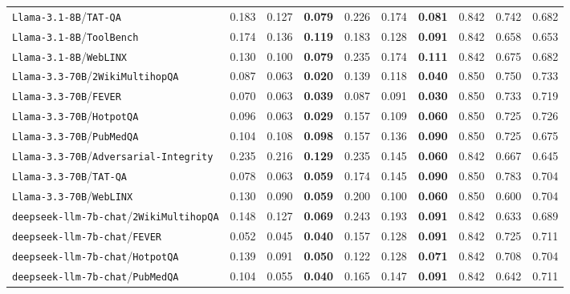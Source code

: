 \begin{longtable}{l|ccc|ccc|ccc}
\texttt{Llama-3.1-8B}/\texttt{TAT-QA} & 0.183 & 0.127 & \textbf{0.079} & 0.226 & 0.174 & \textbf{0.081} & 0.842 & 0.742 & 0.682 \\
\texttt{Llama-3.1-8B}/\texttt{ToolBench} & 0.174 & 0.136 & \textbf{0.119} & 0.183 & 0.128 & \textbf{0.091} & 0.842 & 0.658 & 0.653 \\
\texttt{Llama-3.1-8B}/\texttt{WebLINX} & 0.130 & 0.100 & \textbf{0.079} & 0.235 & 0.174 & \textbf{0.111} & 0.842 & 0.675 & 0.682 \\
\texttt{Llama-3.3-70B}/\texttt{2WikiMultihopQA} & 0.087 & 0.063 & \textbf{0.020} & 0.139 & 0.118 & \textbf{0.040} & 0.850 & 0.750 & 0.733 \\
\texttt{Llama-3.3-70B}/\texttt{FEVER} & 0.070 & 0.063 & \textbf{0.039} & 0.087 & 0.091 & \textbf{0.030} & 0.850 & 0.733 & 0.719 \\
\texttt{Llama-3.3-70B}/\texttt{HotpotQA} & 0.096 & 0.063 & \textbf{0.029} & 0.157 & 0.109 & \textbf{0.060} & 0.850 & 0.725 & 0.726 \\
\texttt{Llama-3.3-70B}/\texttt{PubMedQA} & 0.104 & 0.108 & \textbf{0.098} & 0.157 & 0.136 & \textbf{0.090} & 0.850 & 0.725 & 0.675 \\
\texttt{Llama-3.3-70B}/\texttt{Adversarial-Integrity} & 0.235 & 0.216 & \textbf{0.129} & 0.235 & 0.145 & \textbf{0.060} & 0.842 & 0.667 & 0.645 \\
\texttt{Llama-3.3-70B}/\texttt{TAT-QA} & 0.078 & 0.063 & \textbf{0.059} & 0.174 & 0.145 & \textbf{0.090} & 0.850 & 0.783 & 0.704 \\
\texttt{Llama-3.3-70B}/\texttt{WebLINX} & 0.130 & 0.090 & \textbf{0.059} & 0.200 & 0.100 & \textbf{0.060} & 0.850 & 0.600 & 0.704 \\
\texttt{deepseek-llm-7b-chat}/\texttt{2WikiMultihopQA} & 0.148 & 0.127 & \textbf{0.069} & 0.243 & 0.193 & \textbf{0.091} & 0.842 & 0.633 & 0.689 \\
\texttt{deepseek-llm-7b-chat}/\texttt{FEVER} & 0.052 & 0.045 & \textbf{0.040} & 0.157 & 0.128 & \textbf{0.091} & 0.842 & 0.725 & 0.711 \\
\texttt{deepseek-llm-7b-chat}/\texttt{HotpotQA} & 0.139 & 0.091 & \textbf{0.050} & 0.122 & 0.128 & \textbf{0.071} & 0.842 & 0.708 & 0.704 \\
\texttt{deepseek-llm-7b-chat}/\texttt{PubMedQA} & 0.104 & 0.055 & \textbf{0.040} & 0.165 & 0.147 & \textbf{0.091} & 0.842 & 0.642 & 0.711 \\
\bottomrule
\end{longtable}
